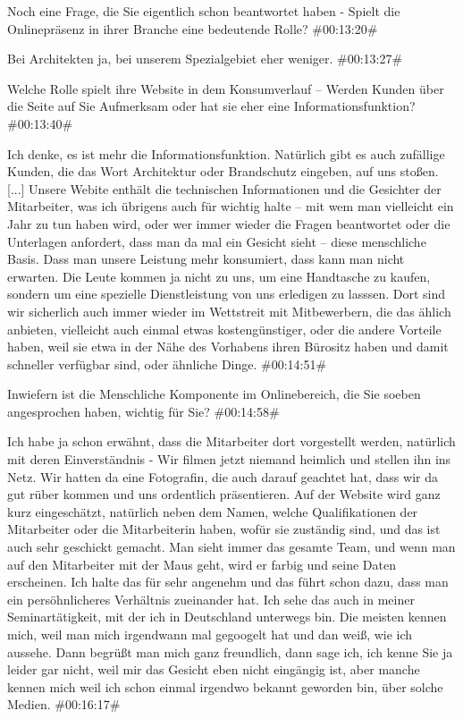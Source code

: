 \documentclass[a4paper, 12pt]{scrartcl}
\begin{document}
\begin{description}
\Fabian Noch eine Frage, die Sie eigentlich schon beantwortet haben - Spielt die Onlinepräsenz in ihrer Branche eine bedeutende Rolle? \#00:13:20\# %

\Andre Bei Architekten ja, bei unserem Spezialgebiet eher weniger. \#00:13:27\#

\Fabian Welche Rolle spielt ihre Website in dem Konsumverlauf – Werden Kunden über die Seite auf Sie Aufmerksam oder hat sie eher eine Informationsfunktion? \#00:13:40\#

\Andre Ich denke, es ist mehr die Informationsfunktion. Natürlich gibt es auch zufällige Kunden, die das Wort Architektur oder Brandschutz eingeben, auf uns stoßen. [...] Unsere Webite enthält die technischen Informationen und die Gesichter der Mitarbeiter, was ich übrigens auch für wichtig halte – mit wem man vielleicht ein Jahr zu tun haben wird, oder wer immer wieder die Fragen beantwortet oder die Unterlagen anfordert, dass man da mal ein Gesicht sieht – diese menschliche Basis. Dass man unsere Leistung mehr konsumiert, dass kann man nicht erwarten. Die Leute kommen ja nicht zu uns, um eine Handtasche zu kaufen, sondern um eine spezielle Dienstleistung von uns erledigen zu lasssen. Dort sind wir sicherlich auch immer wieder im Wettstreit mit Mitbewerbern, die das ählich anbieten, vielleicht auch einmal etwas kostengünstiger, oder die andere Vorteile haben, weil sie etwa in der Nähe des Vorhabens ihren Bürositz haben und damit schneller verfügbar sind, oder ähnliche Dinge. \#00:14:51\#

\Fabian Inwiefern ist die Menschliche Komponente im Onlinebereich, die Sie soeben angesprochen haben, wichtig für Sie? \#00:14:58\#

\Andre Ich habe ja schon erwähnt, dass die Mitarbeiter dort vorgestellt werden, natürlich mit deren Einverständnis - Wir filmen jetzt niemand heimlich und stellen ihn ins Netz. Wir hatten da eine Fotografin, die auch darauf geachtet hat, dass wir da gut rüber kommen und uns ordentlich präsentieren. Auf der Website wird ganz kurz eingeschätzt, natürlich neben dem Namen, welche Qualifikationen der Mitarbeiter oder die Mitarbeiterin haben, wofür sie zuständig sind, und das ist auch sehr geschickt gemacht. Man sieht immer das gesamte Team, und wenn man auf den Mitarbeiter mit der Maus geht, wird er farbig und seine Daten erscheinen. Ich halte das für sehr angenehm und das führt schon dazu, dass man ein persöhnlicheres Verhältnis zueinander hat. Ich sehe das auch in meiner Seminartätigkeit, mit der ich in Deutschland unterwegs bin. Die meisten kennen mich, weil man mich irgendwann mal gegoogelt hat und dan weiß, wie ich aussehe. Dann begrüßt man mich ganz freundlich, dann sage ich, ich kenne Sie ja leider gar nicht, weil mir das Gesicht eben nicht eingängig ist, aber manche kennen mich weil ich schon einmal irgendwo bekannt geworden bin, über solche Medien. \#00:16:17\#


\end{description}
\end{document}
